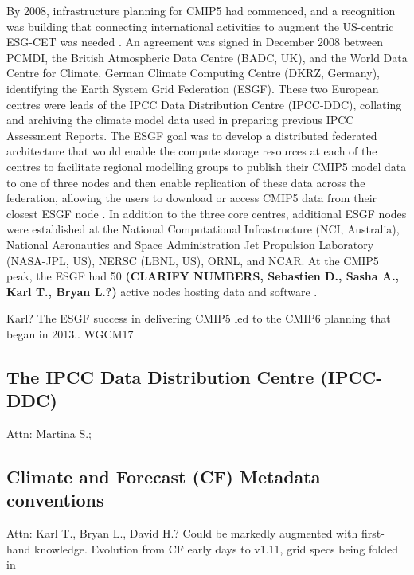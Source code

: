 \documentclass[gmd, preprint]{copernicus}
\newcommand{\mycomment}[1]{}
\def\cred#1{{\color{red}#1}}
\begin{document}
By 2008, infrastructure planning for CMIP5 had commenced, and a recognition was building that connecting international activities to augment the US-centric ESG-CET was needed \citep{williams_global_2016}. An agreement was signed in December 2008 between PCMDI, the British Atmospheric Data Centre (BADC, UK), and the World Data Centre for Climate, German Climate Computing Centre (DKRZ, Germany), identifying the Earth System Grid Federation (ESGF). These two European centres were leads of the IPCC Data Distribution Centre (IPCC-DDC), collating and archiving the climate model data used in preparing previous IPCC Assessment Reports. The ESGF goal was to develop a distributed federated architecture that would enable the compute storage resources at each of the centres to facilitate regional modelling groups to publish their CMIP5 model data to one of three nodes and then enable replication of these data across the federation, allowing the users to download or access CMIP5 data from their closest ESGF node \citep{williams_earth_2011}. In addition to the three core centres, additional ESGF nodes were established at the National Computational Infrastructure (NCI, Australia), National Aeronautics and Space Administration Jet Propulsion Laboratory (NASA-JPL, US), NERSC (LBNL, US), ORNL, and NCAR. At the CMIP5 peak, the ESGF had 50 \cred{\textbf{(CLARIFY NUMBERS, Sebastien D., Sasha A., Karl T., Bryan L.?)}} active nodes hosting data and software \citep{williams_global_2016}.
\mycomment{
CMIP6 current nodes - https://aims2.llnl.gov/nodes
Very early CMIP5 http://web.archive.org/web/20111015000202/http://pcmdi3.llnl.gov/esgcet/home.htm 7 nodes ESG-CET + BADC, WDCC, NCI
ESG-CET NCAR, LLNL, ORNL https://extranet.gfdl.noaa.gov/~vb/curator/AR5-20071017/ESG-CET200710.pdf Oct 2007
2013 Aspen workshop - https://www.wcrp-climate.org/images/modelling/WGCM/WGCM17/WGCM17_report.pdf;
Middleton, Foster and Williams et al., 2006: Earth System Grid II final report 2001-2006 SCIDAC https://www.osti.gov/servlets/purl/1113798 https://doi.org/10.2172/1113798
}
\cred{Karl? The ESGF success in delivering CMIP5 led to the CMIP6 planning that began in 2013.. WGCM17}


\subsection{The IPCC Data Distribution Centre (IPCC-DDC)}
\label{sec:IPCC-DDC}
\cred{Attn: Martina S.; \citep{stockhause_cmip6_2017,stockhause_twenty-five_2022}}


\subsection{Climate and Forecast (CF) Metadata conventions}
\label{sec:CFConventions}
\cred{Attn: Karl T., Bryan L., David H.? Could be markedly augmented with first-hand knowledge. Evolution from CF early days to v1.11, grid specs being folded in}
\end{document}
